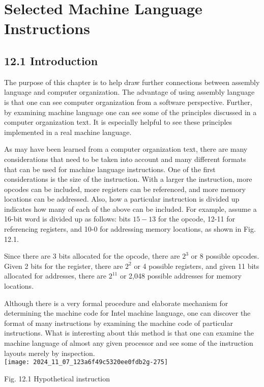 \documentclass[10pt]{article}
\begin{document}
\section*{Selected Machine Language Instructions}
\subsection*{12.1 Introduction}
The purpose of this chapter is to help draw further connections between assembly language and computer organization. The advantage of using assembly language is that one can see computer organization from a software perspective. Further, by examining machine language one can see some of the principles discussed in a computer organization text. It is especially helpful to see these principles implemented in a real machine language.

As may have been learned from a computer organization text, there are many considerations that need to be taken into account and many different formats that can be used for machine language instructions. One of the first considerations is the size of the instruction. With a larger the instruction, more opcodes can be included, more registers can be referenced, and more memory locations can be addressed. Also, how a particular instruction is divided up indicates how many of each of the above can be included. For example, assume a 16-bit word is divided up as follows: bits $15-13$ for the opcode, 12-11 for referencing registers, and 10-0 for addressing memory locations, as shown in Fig. 12.1.

Since there are 3 bits allocated for the opcode, there are $2^{3}$ or 8 possible opcodes. Given 2 bits for the register, there are $2^{2}$ or 4 possible registers, and given 11 bits allocated for addresses, there are $2^{11}$ or 2,048 possible addresses for memory locations.

Although there is a very formal procedure and elaborate mechanism for determining the machine code for Intel machine language, one can discover the format of many instructions by examining the machine code of particular instructions. What is interesting about this method is that one can examine the machine language of almost any given processor and see some of the instruction layouts merely by inspection.\\
\texttt{[image: 2024\_11\_07\_123a6f49c5320ee0fdb2g-275]}

Fig. 12.1 Hypothetical instruction
\end{document}
